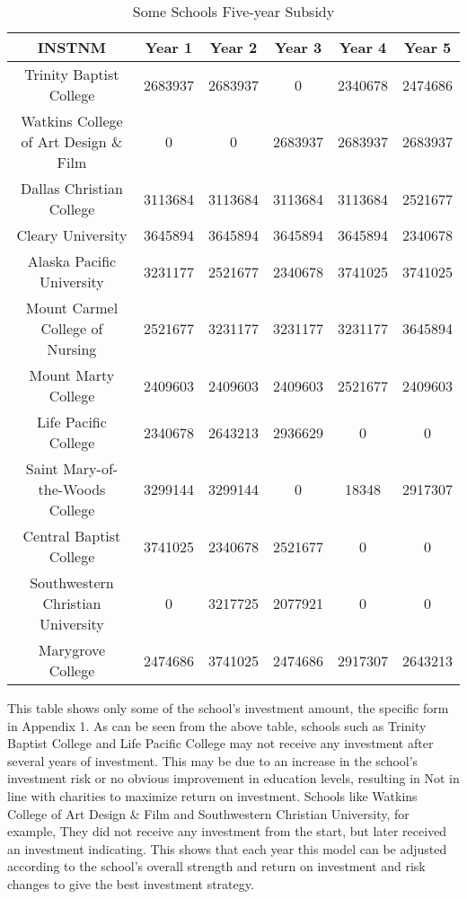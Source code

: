 \documentclass{mcmthesis}
\begin{document}
\begin{table}[h]
\centering
\caption{Some Schools Five-year Subsidy}
\label{tab:Some Schools Five-year Subsidy}
\begin{tabular}{cccccc}
\toprule
INSTNM & Year 1 & Year 2 & Year 3 & Year 4 & Year 5\\
\midrule
Trinity Baptist College & 2683937 & 2683937 & 0 & 2340678 & 2474686\\
Watkins College of Art Design \& Film & 0 & 0 & 2683937 & 2683937 & 2683937\\
Dallas Christian College & 3113684 & 3113684 & 3113684 & 3113684 & 2521677\\
Cleary University & 3645894 & 3645894 & 3645894 & 3645894 & 2340678\\
Alaska Pacific University & 3231177 & 2521677 & 2340678 & 3741025 & 3741025\\
Mount Carmel College of Nursing & 2521677 & 3231177 & 3231177 & 3231177 & 3645894\\
Mount Marty College & 2409603 & 2409603 & 2409603 & 2521677 & 2409603\\
Life Pacific College & 2340678 & 2643213 & 2936629 & 0 & 0\\
Saint Mary-of-the-Woods College & 3299144 & 3299144 & 0 & 18348 & 2917307\\
Central Baptist College & 3741025 & 2340678 & 2521677 & 0 & 0\\
Southwestern Christian University & 0 & 3217725 & 2077921 & 0 & 0\\
Marygrove College & 2474686 & 3741025 & 2474686 & 2917307 & 2643213\\
\bottomrule
\end{tabular}
\end{table}

\newpage

This table shows only some of the school's investment amount, the specific form in Appendix 1. As can be seen from the above table, schools such as Trinity Baptist College and Life Pacific College may not receive any investment after several years of investment. This may be due to an increase in the school's investment risk or no obvious improvement in education levels, resulting in Not in line with charities to maximize return on investment. Schools like Watkins College of Art Design \& Film and Southwestern Christian University, for example, They did not receive any investment from the start, but later received an investment indicating. This shows that each year this model can be adjusted according to the school's overall strength and return on investment and risk changes to give the best investment strategy.
\end{document}
